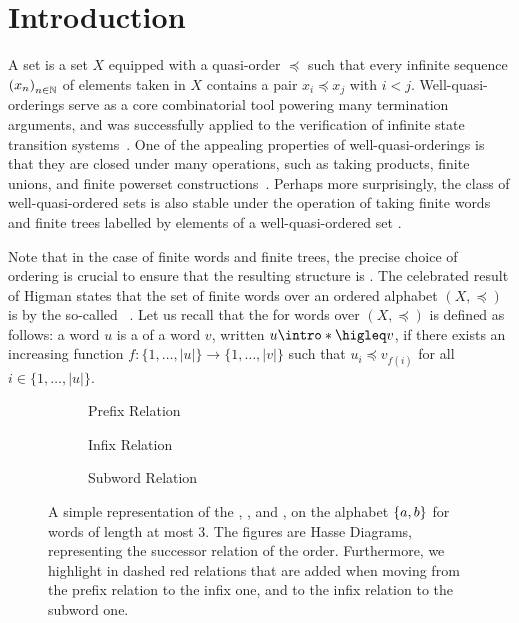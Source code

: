 \section{Introduction}
\label{introduction:sec}

\AP A  set is a set $X$ equipped with a quasi-order
$\preceq$ such that every infinite sequence $\seqof{x_n}$ of elements taken in
$X$ contains a pair $x_i \preceq x_j$ with $i < j$. Well-quasi-orderings serve
as a core combinatorial tool powering many termination arguments, and was
successfully applied to the verification of infinite state transition
systems~\cite{ABDU96,ABDU98}. One of the appealing properties of
well-quasi-orderings is that they are closed under many operations, such as
taking products, finite unions, and finite powerset
constructions~\cite{SCSC12}. Perhaps more surprisingly, the class of
well-quasi-ordered sets is also stable under the operation of taking finite
words and finite trees labelled by elements of a well-quasi-ordered set
\cite{HIG52,KRU72}.

\AP Note that in the case of finite words and finite trees, the precise choice
of ordering is crucial to ensure that the resulting structure is
. The celebrated result of Higman states that the set of
finite words over an ordered alphabet $(X, \preceq)$ is 
by the so-called ~\cite{HIG52}. Let us recall
that the  for words over $(X, \preceq)$ is defined as
follows: a word $u$ is a  of a word $v$, written $u
\intro*\higleq v$, if there exists an increasing function $f \colon \{1,
\ldots, |u|\} \to \{1, \ldots, |v|\}$ such that $u_i \preceq v_{f(i)}$ for all
$i \in \{1, \ldots, |u|\}$.

\begin{figure}
    \centering
    \begin{subfigure}[t]{0.48\textwidth}
    	\centering
    	
    	\caption{Prefix Relation}
   	\end{subfigure}%
   	\hfill%
   	\begin{subfigure}[t]{0.48\textwidth}
   		\centering
   		
   		\caption{Infix Relation}
   	\end{subfigure}
   	\begin{subfigure}[t]{0.48\textwidth}
   		\centering
   		
   		\caption{Subword Relation}
   	\end{subfigure}
   	
   	\caption{A simple representation of the ,
        ,
        and ,
        on the alphabet $\{ a,b \}$ for words of
        length at most $3$. The figures are Hasse Diagrams,
        representing the successor relation of the order.
        Furthermore, we highlight in dashed red relations that are added
        when moving from the prefix relation to the infix one,
        and to the infix relation to the subword one.}
    \label{word-embeddings:fig}
\end{figure}

